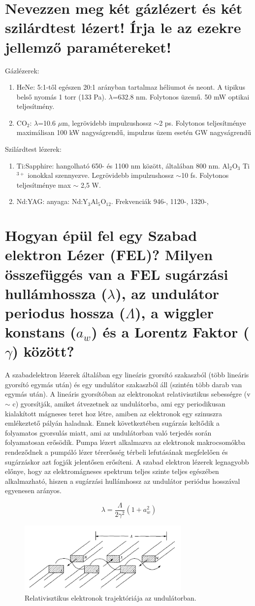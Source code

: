 \documentclass[12pt, a4paper]{article}
\begin{document}
\section{Nevezzen meg két gázlézert és két szilárdtest lézert! Írja le az ezekre jellemző paramétereket!}
Gázlézerek:
\begin{enumerate}
\item HeNe: 5:1-től egészen 20:1 arányban tartalmaz héliumot és neont. A tipikus belső nyomás 1 torr (133 Pa). $\lambda$=632.8 nm. Folytonos üzemű. 50 mW optikai teljesítmény.
\item CO$_2$: $\lambda$=10.6 $\mu$m, legrövidebb impulzushossz $\sim$2 ps. Folytonos teljesítménye maximálisan 100 kW nagyságrendű, impulzus üzem esetén GW nagyságrendű
\end{enumerate}	
Szilárdtest lézerek:	
\begin{enumerate}
\item Ti:Sapphire: hangolható 650- és 1100 nm között, általában 800 nm. Al$_2$O$_3$ Ti$^{3+}$ ionokkal szennyezve. Legrövidebb impulzushossz $\sim$10 fs. Folytonos teljesítménye max $\sim$ 2,5 W.
\item Nd:YAG: anyaga: Nd:Y$_3$Al$_5$O$_{12}$. Frekvenciák 946-, 1120-, 1320-, 
\end{enumerate}

\section{Hogyan épül fel egy Szabad elektron Lézer (FEL)? Milyen összefüggés van a FEL sugárzási hullámhossza ($\lambda$), az undulátor periodus hossza ($\Lambda$), a wiggler konstans ($a_w$) és a Lorentz Faktor ($\gamma$) között?}
A szabadelektron lézerek általában egy lineáris gyorsító szakaszból (több lineáris gyorsító egymás után) és egy undulátor szakaszból áll (szintén több darab van egymás után). A lineáris gyorsítóban az elektronokat relativisztikus sebességre (v $\sim$ c) gyorsítják, amiket átvezetnek az undulátorba, ami egy periodikusan kialakított mágneses teret hoz létre, amiben az elektronok egy szinuszra emlékeztető pályán haladnak. Ennek következtében sugárzás keltődik a folyamatos gyorsulás miatt, ami az undulátorban való terjedés során folyamatosan erősödik. Pumpa lézert alkalmazva az elektronok makrocsomókba rendeződnek a pumpáló lézer térerősség térbeli lefutásának megfelelően és sugárzáskor azt fogják jelentősen erősíteni. A szabad elektron lézerek legnagyobb előnye, hogy az elektromágneses spektrum teljes szinte teljes egészében alkalmazható, hiszen a sugárzási hullámhossz az undulátor periódus hosszával egyenesen arányos.

\begin{equation}
\lambda = \frac{\Lambda}{2\gamma^2} \left( 1 + a_w^2 \right)
\end{equation}

\begin{figure}[H]
\center
\includegraphics[width=0.75\textwidth]{Undulator}
\caption{Relativisztikus elektronok trajektóriája az undulátorban.}
\end{figure}
\end{document}
